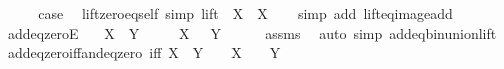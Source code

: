 \begin{isabellebody}
\ \ \isamarkupfalse%
\ \isamarkupfalse%
\ {\isacharquery}{\kern0pt}case\ \isacommand{{\isachardot}{\kern0pt}}\isamarkupfalse%
\isanewline
{}\isamarkupfalse%
%
\endisatagproof
{\isafoldproof}%
%
\isadelimproof
\isanewline
%
\endisadelimproof
\isanewline
{}\isamarkupfalse%
\ lift{\isacharunderscore}{\kern0pt}zero{\isacharunderscore}{\kern0pt}eq{\isacharunderscore}{\kern0pt}self\ {\isacharbrackleft}{\kern0pt}simp{\isacharbrackright}{\kern0pt}{\isacharcolon}{\kern0pt}\ {\isachardoublequoteopen}lift\ {}\ X\ {\isacharequal}{\kern0pt}\ X{\isachardoublequoteclose}\isanewline
%
\isadelimproof
\ \ %
\endisadelimproof
%
\isatagproof
{}\isamarkupfalse%
\ {\isacharparenleft}{\kern0pt}simp\ add{\isacharcolon}{\kern0pt}\ lift{\isacharunderscore}{\kern0pt}eq{\isacharunderscore}{\kern0pt}image{\isacharunderscore}{\kern0pt}add{\isacharparenright}{\kern0pt}%
\endisatagproof
{\isafoldproof}%
%
\isadelimproof
\isanewline
%
\endisadelimproof
\isanewline
{}\isamarkupfalse%
\ add{\isacharunderscore}{\kern0pt}eq{\isacharunderscore}{\kern0pt}zeroE{\isacharcolon}{\kern0pt}\isanewline
\ \ \ {\isachardoublequoteopen}X\ {\isacharplus}{\kern0pt}\ Y\ {\isacharequal}{\kern0pt}\ {}{\isachardoublequoteclose}\isanewline
\ \ \ {\isachardoublequoteopen}X\ {\isacharequal}{\kern0pt}\ {}{\isachardoublequoteclose}\ {\isachardoublequoteopen}Y\ {\isacharequal}{\kern0pt}\ {}{\isachardoublequoteclose}\isanewline
%
\isadelimproof
\ \ %
\endisadelimproof
%
\isatagproof
{}\isamarkupfalse%
\ assms\ \isamarkupfalse%
\ {\isacharparenleft}{\kern0pt}auto\ simp{\isacharcolon}{\kern0pt}\ add{\isacharunderscore}{\kern0pt}eq{\isacharunderscore}{\kern0pt}bin{\isacharunderscore}{\kern0pt}union{\isacharunderscore}{\kern0pt}lift{\isacharparenright}{\kern0pt}%
\endisatagproof
{\isafoldproof}%
%
\isadelimproof
\isanewline
%
\endisadelimproof
\isanewline
{}\isamarkupfalse%
\ add{\isacharunderscore}{\kern0pt}eq{\isacharunderscore}{\kern0pt}zero{\isacharunderscore}{\kern0pt}iff{\isacharunderscore}{\kern0pt}and{\isacharunderscore}{\kern0pt}eq{\isacharunderscore}{\kern0pt}zero\ {\isacharbrackleft}{\kern0pt}iff{\isacharbrackright}{\kern0pt}{\isacharcolon}{\kern0pt}\ {\isachardoublequoteopen}X\ {\isacharplus}{\kern0pt}\ Y\ {\isacharequal}{\kern0pt}\ {}\ {\isasymlongleftrightarrow}\ X\ {\isacharequal}{\kern0pt}\ {}\ {\isasymand}\ Y\ {\isacharequal}{\kern0pt}\ {}{\isachardoublequoteclose}\isanewline

\end{isabellebody}
